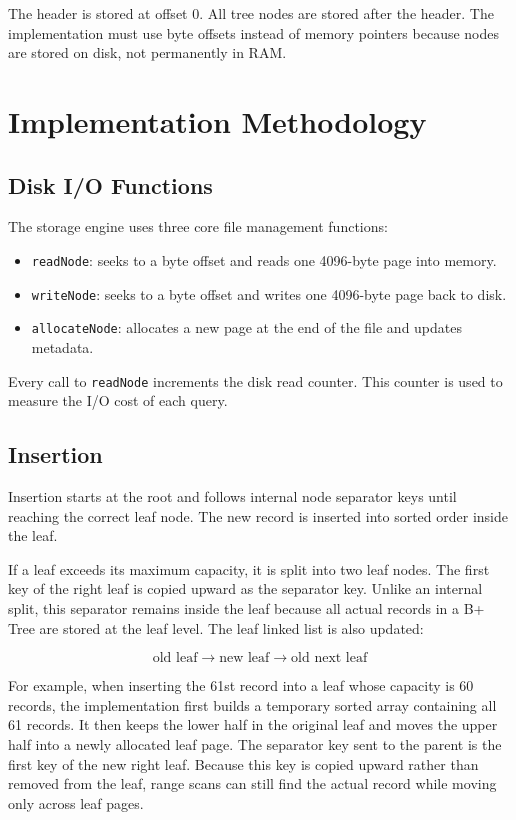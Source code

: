 \documentclass[12pt,a4paper]{article}
\begin{document}
The header is stored at offset 0. All tree nodes are stored after the header. The implementation must use byte offsets instead of memory pointers because nodes are stored on disk, not permanently in RAM.

\section{Implementation Methodology}

\subsection{Disk I/O Functions}

The storage engine uses three core file management functions:

\begin{itemize}
    \item \texttt{readNode}: seeks to a byte offset and reads one 4096-byte page into memory.
    \item \texttt{writeNode}: seeks to a byte offset and writes one 4096-byte page back to disk.
    \item \texttt{allocateNode}: allocates a new page at the end of the file and updates metadata.
\end{itemize}

Every call to \texttt{readNode} increments the disk read counter. This counter is used to measure the I/O cost of each query.

\subsection{Insertion}

Insertion starts at the root and follows internal node separator keys until reaching the correct leaf node. The new record is inserted into sorted order inside the leaf.

If a leaf exceeds its maximum capacity, it is split into two leaf nodes. The first key of the right leaf is copied upward as the separator key. Unlike an internal split, this separator remains inside the leaf because all actual records in a B+ Tree are stored at the leaf level. The leaf linked list is also updated:

\[
\text{old leaf} \rightarrow \text{new leaf} \rightarrow \text{old next leaf}
\]

For example, when inserting the 61st record into a leaf whose capacity is 60 records, the implementation first builds a temporary sorted array containing all 61 records. It then keeps the lower half in the original leaf and moves the upper half into a newly allocated leaf page. The separator key sent to the parent is the first key of the new right leaf. Because this key is copied upward rather than removed from the leaf, range scans can still find the actual record while moving only across leaf pages.
\end{document}
